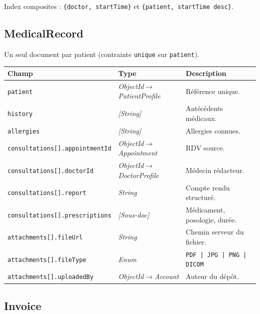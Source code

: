 \documentclass[12pt,a4paper]{report}
\newcommand{\field}[1]{\texttt{\small\textcolor{MedTealDark}{#1}}}
\newcommand{\typ}[1]{\textit{\small\textcolor{CommentGray}{#1}}}
\begin{document}
Index composites : \texttt{\{doctor, startTime\}} et \texttt{\{patient, startTime desc\}}.

\subsection{MedicalRecord}

Un seul document par patient (contrainte \texttt{unique} sur \texttt{patient}).

\begin{center}
\small
\begin{tabularx}{\textwidth}{@{} l l X @{}}
  \toprule
  \textbf{Champ} & \textbf{Type} & \textbf{Description} \\
  \midrule
  \field{patient}                     & \typ{ObjectId$\to$PatientProfile}  & Référence unique. \\
  \field{history}                     & \typ{[String]}                     & Antécédents médicaux. \\
  \field{allergies}                   & \typ{[String]}                     & Allergies connues. \\
  \field{consultations[].appointmentId}& \typ{ObjectId$\to$Appointment}    & RDV source. \\
  \field{consultations[].doctorId}    & \typ{ObjectId$\to$DoctorProfile}   & Médecin rédacteur. \\
  \field{consultations[].report}      & \typ{String}                       & Compte rendu structuré. \\
  \field{consultations[].prescriptions}& \typ{[Sous-doc]}                  & Médicament, posologie, durée. \\
  \field{attachments[].fileUrl}       & \typ{String}                       & Chemin serveur du fichier. \\
  \field{attachments[].fileType}      & \typ{Enum}                         & \texttt{PDF | JPG | PNG | DICOM} \\
  \field{attachments[].uploadedBy}    & \typ{ObjectId$\to$Account}         & Auteur du dépôt. \\
  \bottomrule
\end{tabularx}
\end{center}

\subsection{Invoice}
\end{document}
